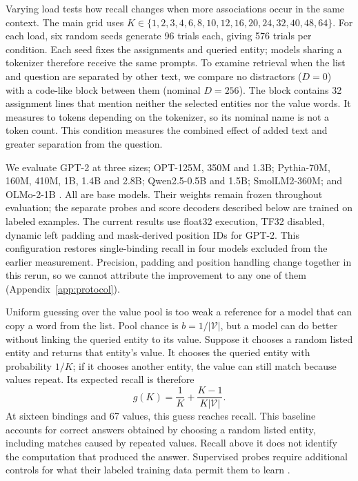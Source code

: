 \documentclass{article}
\begin{document}
Varying load tests how recall changes when more associations occur in the same context.
The main grid uses $K\in\{1,2,3,4,6,8,10,12,16,20,24,32,40,48,64\}$.
For each load, six random seeds generate 96 trials each, giving 576 trials per condition.
Each seed fixes the assignments and queried entity; models sharing a tokenizer therefore receive the same prompts.
To examine retrieval when the list and question are separated by other text, we compare no distractors ($D=0$) with a code-like block between them (nominal $D=256$).
The block contains 32 assignment lines that mention neither the selected entities nor the value words.
It measures \RevFillerLo{} to \RevFillerHi{} tokens depending on the tokenizer, so its nominal name is not a token count.
This condition measures the combined effect of added text and greater separation from the question.

We evaluate GPT-2 at three sizes; OPT-125M, 350M and 1.3B; Pythia-70M, 160M, 410M, 1B, 1.4B and 2.8B; Qwen2.5-0.5B and 1.5B; SmolLM2-360M; and OLMo-2-1B \citep{zhang2022opt,biderman2023,qwen2024,smollm2025,olmo2024}.
All are base models.
Their weights remain frozen throughout evaluation; the separate probes and score decoders described below are trained on labeled examples.
The current results use float32 execution, TF32 disabled, dynamic left padding and mask-derived position IDs for GPT-2.
This configuration restores single-binding recall in four models excluded from the earlier measurement.
Precision, padding and position handling change together in this rerun, so we cannot attribute the improvement to any one of them (Appendix~\ref{app:protocol}).

Uniform guessing over the value pool is too weak a reference for a model that can copy a word from the list.
Pool chance is $b=1/|\mathcal V|$, but a model can do better without linking the queried entity to its value.
Suppose it chooses a random listed entity and returns that entity's value.
It chooses the queried entity with probability $1/K$; if it chooses another entity, the value can still match because values repeat.
Its expected recall is therefore
\begin{equation}
 g(K)=\frac{1}{K}+\frac{K-1}{K|\mathcal V|}.
 \label{eq:listed-guess}
\end{equation}
At sixteen bindings and 67 values, this guess reaches \NewGuessSixteen{} recall.
This baseline accounts for correct answers obtained by choosing a random listed entity, including matches caused by repeated values.
Recall above it does not identify the computation that produced the answer.
Supervised probes require additional controls for what their labeled training data permit them to learn \citep{hewitt2019}.
\end{document}
